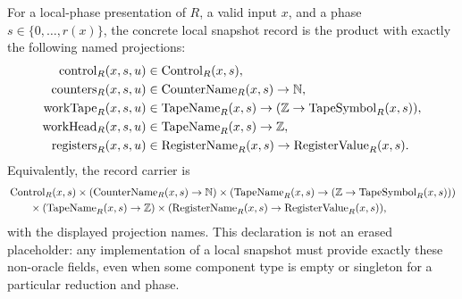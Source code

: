 \begin{definition}
  \label{def:oracle-reduction-local-snapshot-record}
  For a local-phase presentation of $R$, a valid input $x$, and a phase
  $s\in\{0,\ldots,r(x)\}$, the concrete local snapshot record is the product
  with exactly the following named projections:
  \[
  \begin{aligned}
    \operatorname{control}_R(x,s,u)&\in\operatorname{Control}_R(x,s),\\
    \operatorname{counters}_R(x,s,u)&\in
      \operatorname{CounterName}_R(x,s)\to\mathbb{N},\\
    \operatorname{workTape}_R(x,s,u)&\in
      \operatorname{TapeName}_R(x,s)\to
      (\mathbb{Z}\to\operatorname{TapeSymbol}_R(x,s)),\\
    \operatorname{workHead}_R(x,s,u)&\in
      \operatorname{TapeName}_R(x,s)\to\mathbb{Z},\\
    \operatorname{registers}_R(x,s,u)&\in
      \operatorname{RegisterName}_R(x,s)\to
      \operatorname{RegisterValue}_R(x,s).
  \end{aligned}
  \]
  Equivalently, the record carrier is
  \[
  \begin{aligned}
    &\operatorname{Control}_R(x,s)
    \times(\operatorname{CounterName}_R(x,s)\to\mathbb{N})
    \times(\operatorname{TapeName}_R(x,s)\to
      (\mathbb{Z}\to\operatorname{TapeSymbol}_R(x,s)))\\
    &\qquad\times(\operatorname{TapeName}_R(x,s)\to\mathbb{Z})
    \times(\operatorname{RegisterName}_R(x,s)\to
      \operatorname{RegisterValue}_R(x,s)),
  \end{aligned}
  \]
  with the displayed projection names.  This declaration is not an erased
  placeholder: any implementation of a local snapshot must provide exactly
  these non-oracle fields, even when some component type is empty or singleton
  for a particular reduction and phase.
\end{definition}

